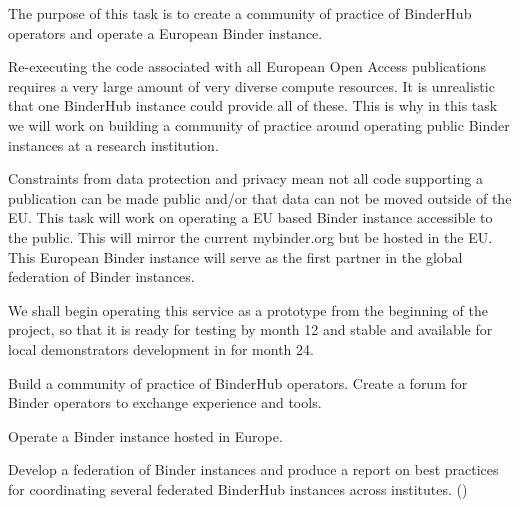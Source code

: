 \begin{task}[
  title=Prototype European Binder instance and global federation,
  id=eu-binder,
  lead=SRL,
  PM=21,  %
  wphases={0-48},
  partners={EGI,UPSUD,WTT}
]

  The purpose of this task is to create a community of practice of BinderHub
  operators and operate a European Binder instance.

  Re-executing the code associated with all European Open Access publications
  requires a very large amount of very diverse compute resources. It is
  unrealistic that one BinderHub instance could provide all of these. This is
  why in this task we will work on building a community of practice around
  operating public Binder instances at a research institution.

  Constraints from data protection and privacy mean not all code supporting a
  publication can be made public and/or that data can not be moved outside of
  the EU. This task will work on operating a EU based Binder instance accessible
  to the public. This will mirror the current mybinder.org but be hosted in
  the EU. This European Binder instance will serve as the first partner in the
  global federation of Binder instances.

  We shall begin operating this service as a prototype
  from the beginning of the project,
  so that it is ready for testing by month 12
  and stable and available for local demonstrators
  development in  for month 24.


  \begin{compactitem}
  \item Build a community of practice of BinderHub operators. Create a forum
  for Binder operators to exchange experience and tools.

  \item Operate a Binder instance hosted in Europe.

  \item Develop a federation of Binder instances and produce a report on best
    practices for coordinating several federated BinderHub instances across
    institutes.
    ()
  \end{compactitem}
\end{task}
